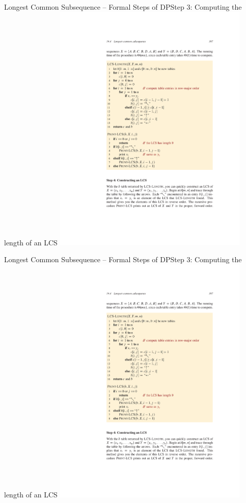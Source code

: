 \documentclass[aspectratio=169]{beamer}
\begin{document}
\begin{frame}{Longest Common Subsequence -- Formal Steps of DP}{Step 3: Computing the length of an LCS}
    \centering
    \includegraphics[width=0.7\textwidth,clip,trim=5.50cm 13.75cm 4.5cm 6cm]{figures/pseudocodes}
\end{frame}

\begin{frame}{Longest Common Subsequence -- Formal Steps of DP}{Step 3: Computing the length of an LCS}
    \centering
    \includegraphics[width=0.7\textwidth,clip,trim=5.50cm 8cm 4.5cm 14.25cm]{figures/pseudocodes}
\end{frame}
\end{document}
